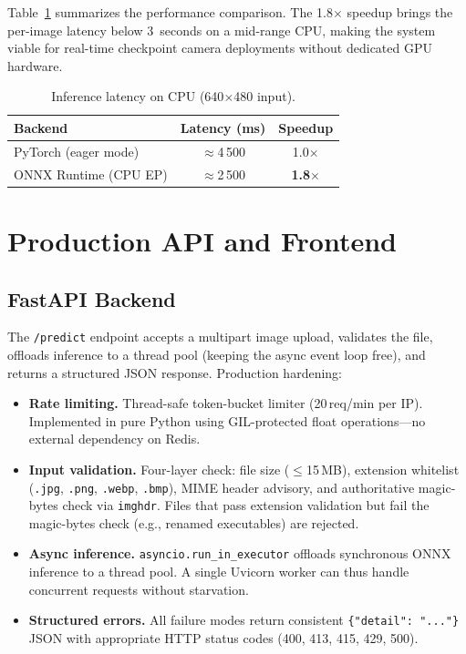 \documentclass[10pt,twocolumn]{article}
\begin{document}
Table~\ref{tab:speed} summarizes the performance comparison. The 1.8$\times$
speedup brings the per-image latency below 3~seconds on a mid-range CPU,
making the system viable for real-time checkpoint camera deployments without
dedicated GPU hardware.

\begin{table}[H]
\centering
\small
\caption{Inference latency on CPU (640$\times$480 input).}
\label{tab:speed}
\renewcommand{\arraystretch}{1.15}
\begin{tabular}{lcc}
\toprule
\textbf{Backend} & \textbf{Latency (ms)} & \textbf{Speedup}\\
\midrule
PyTorch (eager mode)  & $\approx$4\,500 & 1.0$\times$\\
ONNX Runtime (CPU EP) & $\approx$2\,500 & \textbf{1.8$\times$}\\
\bottomrule
\end{tabular}
\end{table}

\section{Production API and Frontend}

\subsection{FastAPI Backend}

The \texttt{/predict} endpoint accepts a multipart image upload, validates
the file, offloads inference to a thread pool (keeping the async event loop
free), and returns a structured JSON response. Production hardening:

\begin{itemize}
  \item \textbf{Rate limiting.} Thread-safe token-bucket limiter (20\,req/min
        per IP). Implemented in pure Python using GIL-protected float
        operations---no external dependency on Redis.
  \item \textbf{Input validation.} Four-layer check: file size ($\leq$15\,MB),
        extension whitelist (\texttt{.jpg}, \texttt{.png}, \texttt{.webp},
        \texttt{.bmp}), MIME header advisory, and authoritative magic-bytes
        check via \texttt{imghdr}. Files that pass extension validation but
        fail the magic-bytes check (e.g., renamed executables) are rejected.
  \item \textbf{Async inference.} \texttt{asyncio.run\_in\_executor} offloads
        synchronous ONNX inference to a thread pool. A single Uvicorn worker
        can thus handle concurrent requests without starvation.
  \item \textbf{Structured errors.} All failure modes return consistent
        \texttt{\{"detail": "..."\}} JSON with appropriate HTTP status codes
        (400, 413, 415, 429, 500).
\end{itemize}
\end{document}
